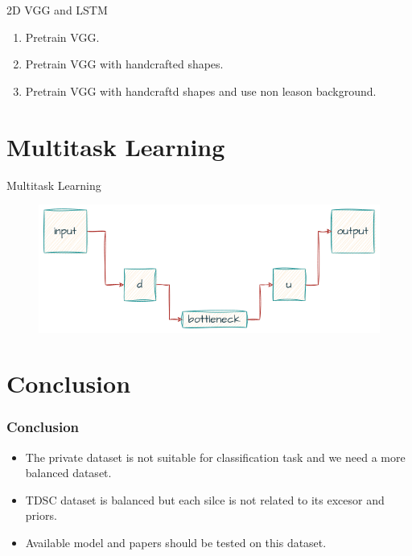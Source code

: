 \documentclass{beamer}
\begin{document}
\begin{frame}{2D VGG and LSTM}
	\begin{enumerate}
		\item Pretrain VGG.
		\item Pretrain VGG with handcrafted shapes.
		\item Pretrain VGG with handcraftd shapes and use non leason background.
	\end{enumerate}
\end{frame}


\section{Multitask Learning}
\begin{frame}{Multitask Learning}
	\begin{center}
		\begin{figure}
			\includegraphics[scale=0.5]{unet.png}
			\centering
		\end{figure}
	\end{center}
\end{frame}

\section{Conclusion}
\begin{frame}
	\frametitle{Conclusion}
	\begin{itemize}
		\item The private dataset is not suitable for classification task and we  need a more balanced dataset.
		\item TDSC dataset is balanced but each silce is not related to its excesor and priors.
		\item Available model and papers should be tested on this dataset.
	\end{itemize}
\end{frame}
\end{document}
